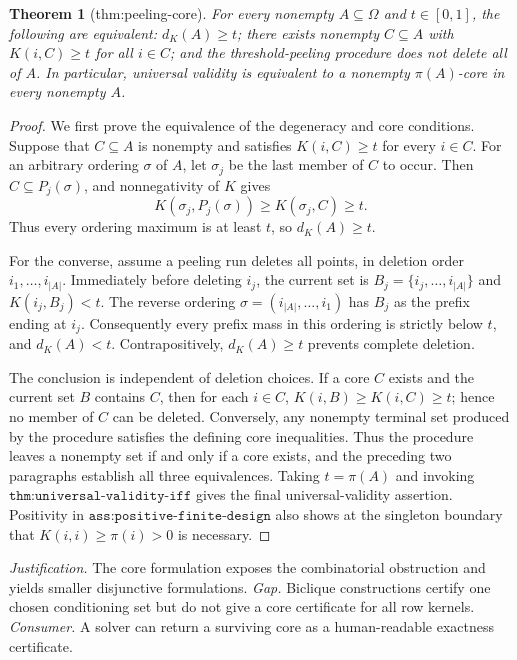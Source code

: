\documentclass{article}
\newtheorem{theorem}{Theorem}
\begin{document}
\begin{theorem}[thm:peeling-core]\label{thm:peeling-core}
For every nonempty \(A\subseteq\Omega\) and \(t\in[0,1]\), the following are equivalent: \(d_K(A)\geq t\); there exists nonempty \(C\subseteq A\) with \(K(i,C)\geq t\) for all \(i\in C\); and the threshold-peeling procedure does not delete all of \(A\). In particular, universal validity is equivalent to a nonempty \(\pi(A)\)-core in every nonempty \(A\).
\end{theorem}
\begin{proof}
We first prove the equivalence of the degeneracy and core conditions.  Suppose that
\(C\subseteq A\) is nonempty and satisfies \(K(i,C)\geq t\) for every \(i\in C\).
For an arbitrary ordering \(\sigma\) of \(A\), let \(\sigma_j\) be the last member
of \(C\) to occur.  Then \(C\subseteq P_j(\sigma)\), and nonnegativity of \(K\)
gives
\[
K(\sigma_j,P_j(\sigma))\geq K(\sigma_j,C)\geq t.
\]
Thus every ordering maximum is at least \(t\), so \(d_K(A)\geq t\).

For the converse, assume a peeling run deletes all points, in deletion order
\(i_1,\ldots,i_{|A|}\).  Immediately before deleting \(i_j\), the current set is
\(B_j=\{i_j,\ldots,i_{|A|}\}\) and
\(K(i_j,B_j)<t\).  The reverse ordering
\(\sigma=(i_{|A|},\ldots,i_1)\) has \(B_j\) as the prefix ending at \(i_j\).
Consequently every prefix mass in this ordering is strictly below \(t\), and
\(d_K(A)<t\).  Contrapositively, \(d_K(A)\geq t\) prevents complete deletion.

The conclusion is independent of deletion choices.  If a core \(C\) exists and
the current set \(B\) contains \(C\), then for each \(i\in C\),
\(K(i,B)\geq K(i,C)\geq t\); hence no member of \(C\) can be deleted.  Conversely,
any nonempty terminal set produced by the procedure satisfies the defining core
inequalities.  Thus the procedure leaves a nonempty set if and only if a core
exists, and the preceding two paragraphs establish all three equivalences.  Taking
\(t=\pi(A)\) and invoking \(\texttt{thm:universal-validity-iff}\) gives the final
universal-validity assertion.  Positivity in
\(\texttt{ass:positive-finite-design}\) also shows at the singleton boundary that
\(K(i,i)\geq\pi(i)>0\) is necessary.
\end{proof}
\par\smallskip\noindent \textit{Justification.} The core formulation exposes the combinatorial obstruction and yields smaller disjunctive formulations. \textit{Gap.} Biclique constructions certify one chosen conditioning set but do not give a core certificate for all row kernels. \textit{Consumer.} A solver can return a surviving core as a human-readable exactness certificate.
\end{document}
